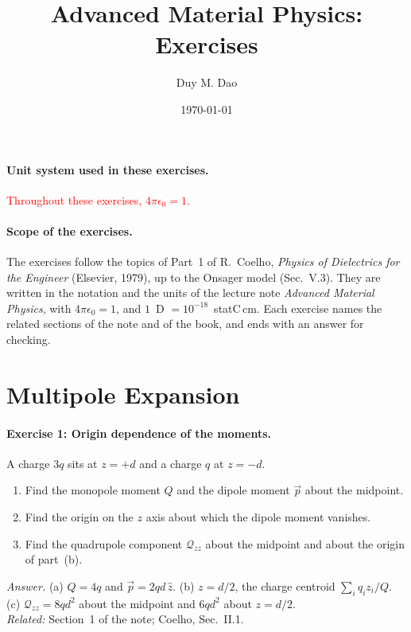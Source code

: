 \documentclass[11pt]{article}      %
\title{Advanced Material Physics: Exercises}
\author{Duy M. Dao}
\date{\today}                      %
\numberwithin{equation}{section}   %
\begin{document}
\maketitle                         %

\paragraph{Unit system used in these exercises.}
\textcolor{red}{Throughout these exercises, $4\pi\epsilon_0 = 1$.}

\newenvironment{parts}
  {\begin{enumerate}\renewcommand{\theenumi}{\alph{enumi}}\renewcommand{\labelenumi}{(\theenumi)}}
  {\end{enumerate}}

\paragraph{Scope of the exercises.}
The exercises follow the topics of Part~1 of R.~Coelho, \textit{Physics of Dielectrics for the Engineer} (Elsevier, 1979), up to the Onsager model (Sec.~V.3). They are written in the notation and the units of the lecture note \textit{Advanced Material Physics}, with $4\pi\epsilon_0 = 1$, and $1$~D $= 10^{-18}$~statC\,cm. Each exercise names the related sections of the note and of the book, and ends with an answer for checking.

\section{Multipole Expansion}

\paragraph{Exercise 1: Origin dependence of the moments.}
A charge $3q$ sits at $z = +d$ and a charge $q$ at $z = -d$.
\begin{parts}
    \item Find the monopole moment $Q$ and the dipole moment $\vec p$ about the midpoint.
    \item Find the origin on the $z$ axis about which the dipole moment vanishes.
    \item Find the quadrupole component $\mathcal{Q}_{zz}$ about the midpoint and about the origin of part~(b).
\end{parts}
\textit{Answer.} (a) $Q = 4q$ and $\vec p = 2qd\,\hat z$. (b) $z = d/2$, the charge centroid $\sum_i q_iz_i/Q$. (c) $\mathcal{Q}_{zz} = 8qd^2$ about the midpoint and $6qd^2$ about $z = d/2$.\\
\textit{Related:} Section~1 of the note; Coelho, Sec.~II.1.
\end{document}
